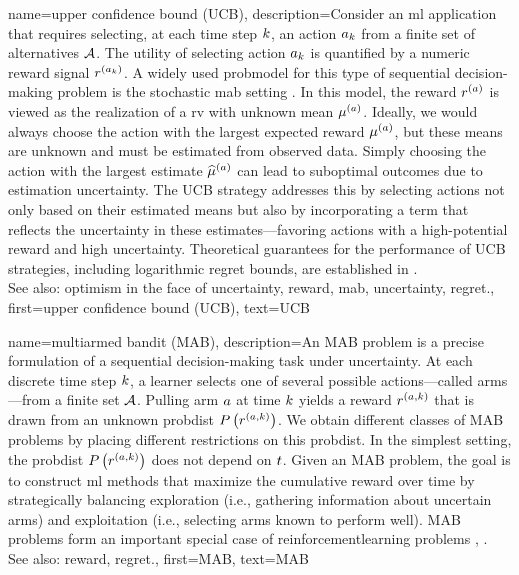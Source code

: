 {name={upper confidence bound (UCB)},
	description={Consider an \gls{ml} 
		application that requires selecting, at each time step $k$, an action $a_{k}$ 
		from a finite set of alternatives $\mathcal{A}$. The utility of selecting action $a_{k}$ 
		is quantified by a numeric \gls{reward} signal $r^{(a_{k})}$. 
		A widely used \gls{probmodel} for this type of sequential decision-making problem 
		is the \gls{stochastic} \gls{mab} setting \cite{Bubeck2012}. In this \gls{model}, 
		the \gls{reward} $r^{(a)}$ is viewed as the \gls{realization} of a \gls{rv} 
		with unknown \gls{mean} $\mu^{(a)}$. Ideally, we would always choose the 
		action with the largest expected \gls{reward} $\mu^{(a)}$, but these 
		\glspl{mean} are unknown and must be estimated from observed \gls{data}. Simply 
		choosing the action with the largest estimate $\widehat{\mu}^{(a)}$ can 
		lead to suboptimal outcomes due to estimation \gls{uncertainty}. The UCB strategy 
		addresses this by selecting actions not only based on their estimated \glspl{mean} but 
		also by incorporating a term that reflects the \gls{uncertainty} in these estimates—favoring 
		actions with a high-potential \gls{reward} and high \gls{uncertainty}. Theoretical guarantees 
		for the performance of UCB strategies, including logarithmic \gls{regret} bounds, are established in \cite{Bubeck2012}.
					\\ 
		See also: \gls{optimism in the face of uncertainty}, \gls{reward}, \gls{mab}, \gls{uncertainty}, \gls{regret}.},
	first={upper confidence bound (UCB)},
	text={UCB} 
}

{name={multiarmed bandit (MAB)},
	description={An MAB  problem is a precise 
	formulation of a sequential decision-making task under \gls{uncertainty}. At each 
	discrete time step $k$, a learner selects one of several possible 
	actions—called arms—from a finite set $\mathcal{A}$. Pulling arm $a$ at time 
	$k$ yields a \gls{reward} $r^{(a,k)}$ that is drawn from an unknown 
	\gls{probdist} $P\left(r^{(a,k)}\right)$. We obtain different classes 
	of MAB problems by placing different restrictions on this \gls{probdist}. In the simplest 
	setting, the \gls{probdist} $P\left(r^{(a,k)}\right)$ does not depend on $t$. 
		Given an MAB problem, the goal is to construct \gls{ml} methods that maximize the cumulative 
		\gls{reward} over time by strategically balancing exploration (i.e., gathering information 
		about uncertain arms) and exploitation (i.e., selecting arms known to perform well). 
		MAB problems form an important special case of \gls{reinforcementlearning} problems \cite{Bubeck2012}, \cite{SuttonEd2}.
					\\ 
		See also: \gls{reward}, \gls{regret}.},
	first={MAB},
	text={MAB}
}



